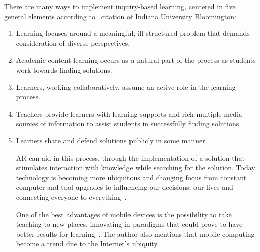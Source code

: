 \documentclass[a4paper,twoside]{article}
\begin{document}
There are many ways to implement inquiry-based learning, centered in five general elements according to~\cite{4Phaseso86} citation of Indiana University Bloomington:
\begin{enumerate}
\item Learning focuses around a meaningful, ill-structured problem that demands consideration of diverse perspectives.

\item Academic content-learning occurs as a natural part of the process as students work towards finding solutions.

\item Learners, working collaboratively, assume an active role in the learning process.

\item Teachers provide learners with learning supports and rich multiple media sources of information to assist students in successfully finding solutions.

\item Learners share and defend solutions publicly in some manner.

AR can aid in this process, through the implementation of a solution that stimulates interaction with knowledge while searching for the solution. Today technology is becoming more ubiquitous and changing focus from constant computer and tool upgrades to influencing our decisions, our lives and connecting everyone to everything~\cite{galloway2004intimations}.

One of the best advantages of mobile devices is the possibility to take teaching to new places, innovating in paradigms that could prove to have better results for learning~\cite{fitzgerald2013augmented}. The author also mentions that mobile computing become a trend due to the Internet's ubiquity.
\end{enumerate}
\end{document}

